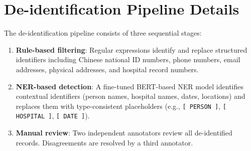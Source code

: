 \section{De-identification Pipeline Details}

The de-identification pipeline consists of three sequential stages:
\begin{enumerate}
\item \textbf{Rule-based filtering}: Regular expressions identify and replace structured identifiers including Chinese national ID numbers, phone numbers, email addresses, physical addresses, and hospital record numbers.
\item \textbf{NER-based detection}: A fine-tuned BERT-based NER model identifies contextual identifiers (person names, hospital names, dates, locations) and replaces them with type-consistent placeholders (e.g., \texttt{[\,PERSON\,]}, \texttt{[\,HOSPITAL\,]}, \texttt{[\,DATE\,]}).
\item \textbf{Manual review}: Two independent annotators review all de-identified records. Disagreements are resolved by a third annotator.
\end{enumerate}


